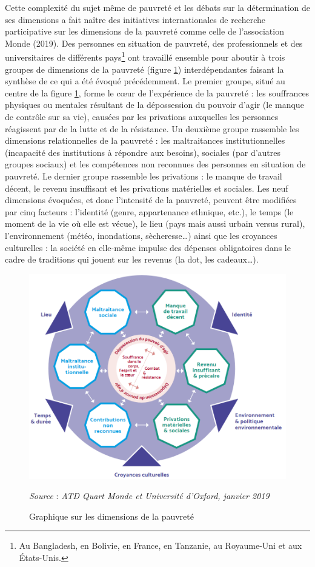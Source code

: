 \documentclass[12pt,a4paper]{reedthesis}
\begin{document}
Cette complexité du sujet même de pauvreté et les débats sur la détermination de ses dimensions a fait naître des initiatives internationales de recherche participative sur les dimensions de la pauvreté comme celle de l'association Monde (2019). Des personnes en situation de pauvreté, des professionnels et des universitaires de différents pays\footnote{Au Bangladesh, en Bolivie, en France, en Tanzanie, au Royaume-Uni et aux États-Unis.} ont travaillé ensemble pour aboutir à trois groupes de dimensions de la pauvreté (figure \ref{fig:figatd}) interdépendantes faisant la synthèse de ce qui a été évoqué précédemment. Le premier groupe, situé au centre de la figure \ref{fig:figatd}, forme le cœur de l'expérience de la pauvreté : les souffrances physiques ou mentales résultant de la dépossession du pouvoir d'agir (le manque de contrôle sur sa vie), causées par les privations auxquelles les personnes réagissent par de la lutte et de la résistance. Un deuxième groupe rassemble les dimensions relationnelles de la pauvreté : les maltraitances institutionnelles (incapacité des institutions à répondre aux besoins), sociales (par d'autres groupes sociaux) et les compétences non reconnues des personnes en situation de pauvreté. Le dernier groupe rassemble les privations : le manque de travail décent, le revenu insuffisant et les privations matérielles et sociales. Les neuf dimensions évoquées, et donc l'intensité de la pauvreté, peuvent être modifiées par cinq facteurs : l'identité (genre, appartenance ethnique, etc.), le temps (le moment de la vie où elle est vécue), le lieu (pays mais aussi urbain versus rural), l'environnement (météo, inondations, sècheresse\ldots) ainsi que les croyances culturelles : la société en elle-même impulse des dépenses obligatoires dans le cadre de traditions qui jouent sur les revenus (la dot, les cadeaux\ldots).
\begin{figure}[!ht]

{\centering \includegraphics[width=0.8\linewidth]{figures/fig_atd} 

}

\caption[Graphique sur les dimensions de la pauvreté]{Graphique sur les dimensions de la pauvreté}\label{fig:figatd}

\footnotesize


\emph{Source} : \emph{ATD Quart Monde et Université d’Oxford, janvier 2019}
\normalsize\end{figure}
\end{document}
